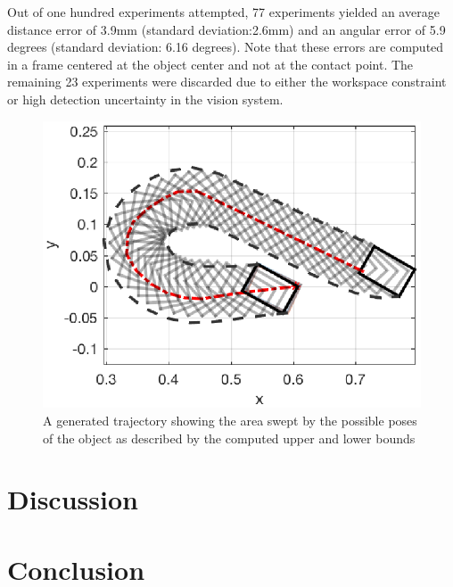 \documentclass[conference]{IEEEtran}
\begin{document}
Out of one hundred experiments attempted, 77 experiments yielded an average distance error of 3.9mm (standard deviation:2.6mm) and an angular error of 5.9 degrees (standard deviation: 6.16 degrees). Note that these errors are computed in a frame centered at the object center and not at the contact point.
The remaining 23 experiments were discarded due to either the workspace constraint or high detection uncertainty in the vision system.



\begin{figure}
\begin{center}
  \includegraphics[width=\columnwidth]{fig/trajectory_1.eps}
\end{center}
\caption{A generated trajectory showing the area swept by the possible poses of the object as described by the computed upper and lower bounds}
\label{fig:trajectory}
\end{figure}






\section{Discussion}\label{sec:discussion}

\section{Conclusion}\label{sec:conclusion}



\end{document}
